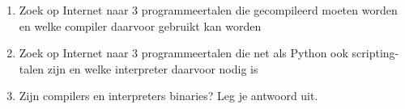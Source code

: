 \begin{enumerate}
\item Zoek op Internet naar 3 programmeertalen die gecompileerd moeten worden en welke compiler daarvoor gebruikt kan worden
\item Zoek op Internet naar 3 programmeertalen die net als Python ook scripting-talen zijn en welke interpreter daarvoor nodig is
\item Zijn compilers en interpreters binaries? Leg je antwoord uit.
\end{enumerate}
